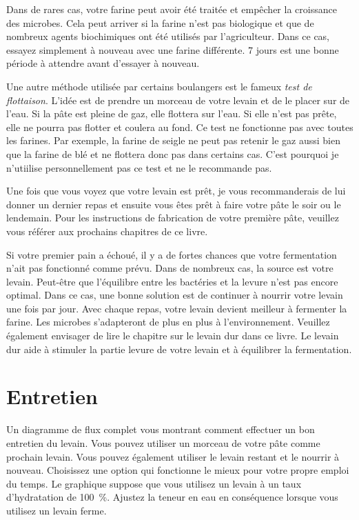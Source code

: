Dans de rares cas, votre farine peut avoir été traitée et empêcher la croissance des microbes. Cela peut arriver si la farine n'est pas biologique et que de nombreux agents biochimiques ont été utilisés par l'agriculteur. Dans ce cas, essayez simplement à nouveau avec une farine différente. 7 jours est une bonne période à attendre avant d'essayer à nouveau.

Une autre méthode utilisée par certains boulangers est le fameux \emph{test de flottaison}. L'idée est de prendre un morceau de votre levain et de le placer sur de l'eau. Si la pâte est pleine de gaz, elle flottera sur l'eau. Si elle n'est pas prête, elle ne pourra pas flotter et coulera au fond. Ce test ne fonctionne pas avec toutes les farines. Par exemple, la farine de seigle ne peut pas retenir le gaz aussi bien que la farine de blé et ne flottera donc pas dans certains cas. C'est pourquoi je n'utiilise personnellement pas ce test et ne le recommande pas.

Une fois que vous voyez que votre levain est prêt, je vous recommanderais de lui donner un dernier repas et ensuite vous êtes prêt à faire votre pâte le soir ou le lendemain. Pour les instructions de fabrication de votre première pâte, veuillez vous référer aux prochains chapitres de ce livre.

Si votre premier pain a échoué, il y a de fortes chances que votre fermentation n'ait pas fonctionné comme prévu. Dans de nombreux cas, la source est votre levain. Peut-être que l'équilibre entre les bactéries et la levure n'est pas encore optimal. Dans ce cas, une bonne solution est de continuer à nourrir votre levain une fois par jour. Avec chaque repas, votre levain devient meilleur à fermenter la farine. Les microbes s'adapteront de plus en plus à l'environnement. Veuillez également envisager de lire le chapitre sur le levain dur dans ce livre. Le levain dur aide à stimuler la partie levure de votre levain et à équilibrer la fermentation.

\section{Entretien}\begin{flowchart}[!htb]
\begin{center}
  
  \caption[Diagramme de flux d'entretien du levain]{Un diagramme de flux complet vous montrant comment effectuer un bon entretien du levain. Vous pouvez utiliser un morceau de votre pâte comme prochain levain. Vous pouvez également utiliser le levain restant et le nourrir à nouveau. Choisissez une option qui fonctionne le mieux pour votre propre emploi du temps. Le graphique suppose que vous utilisez un levain à un taux d'hydratation de \qty{100}{\percent}. Ajustez la teneur en eau en conséquence lorsque vous utilisez un levain ferme.}%
  \label{fig:sourdough-maintenance-process}
\end{center}
\end{flowchart}

